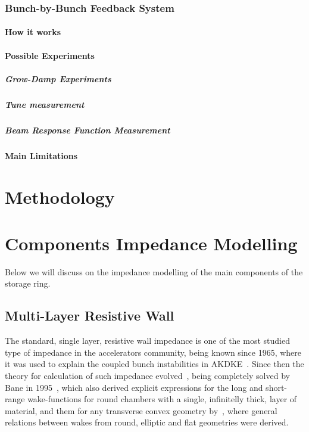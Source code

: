 \subsection{Bunch-by-Bunch Feedback System}
\subsubsection{How it works}
\subsubsection{Possible Experiments}
\paragraph{Grow-Damp Experiments}
\paragraph{Tune measurement}
\paragraph{Beam Response Function Measurement}
\subsubsection{Main Limitations}

\chapter{Methodology}
\section{}


\chapter{Components Impedance Modelling}\label{cap:impedance_modelling}

    Below we will discuss on the impedance modelling of the main components of the storage ring.

\section{Multi-Layer Resistive Wall}

    The standard, single layer, resistive wall impedance is one of the most studied type of impedance in the accelerators community, being known since 1965, where it was used to explain the coupled bunch instabilities in AKDKE~\cite{rw1st}. Since then the theory for calculation of such impedance evolved~\cite{chao}, being completely solved by Bane in 1995~\cite{Bane1995}, which also derived explicit expressions for the long and short-range wake-functions for round chambers with a single, infinitelly thick, layer of material, and them for any transverse convex geometry by~\cite{Yokoya}, where general relations between wakes from round, elliptic and flat geometries were derived.

